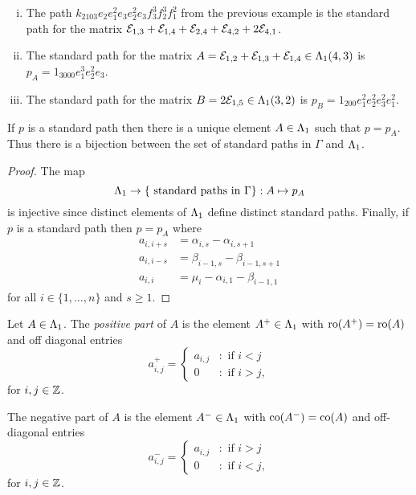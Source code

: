 \documentclass[a4paper, 11pt, twoside]{report}
\begin{document}
\begin{example}
\begin{enumerate}[(i)]
\item
The path $k_{2103}e_2e_1^2e_3e_2^2e_3f_3^3f_2^3f_1^2$ from the previous example is the standard path for the matrix $\mathcal{E}_{1,3}+\mathcal{E}_{1,4}+\mathcal{E}_{2,4}+\mathcal{E}_{4,2}+2\mathcal{E}_{4,1}$.

\item
The standard path for the matrix $A=\mathcal{E}_{1,2}+\mathcal{E}_{1,3}+\mathcal{E}_{1,4}\in\Lambda_1{}{(4,3)}$ is $p_A = 1_{3000}e_1^3e_2^2e_3$.

\item
The standard path for the matrix $B=2\mathcal{E}_{1,5}\in\Lambda_1{}{(3,2)}$ is $p_B = 1_{200}e_1^2e_2^2e_3^2e_1^2$.
\end{enumerate}
\end{example}

\begin{lemma}\label{lemma:correspondence-std-paths-to-basis}
If $p$ is a standard path then there is a unique element $A\in\Lambda_1{}$ such that $p=p_A$. Thus there is a bijection between the set of standard paths in $\Gamma$ and $\Lambda_1{}$.
\end{lemma}

\begin{proof}
The map
\begin{equation*}
\Lambda_1{}\to \{\text{ standard paths in }\Gamma\}:A\mapsto p_A
\end{equation*}
is injective since distinct elements of $\Lambda_1{}$ define distinct standard paths. Finally, if $p$ is a standard path then $p=p_A$ where
\begin{align*}
a_{i,i+s} &= \alpha_{i,s}-\alpha_{i,s+1}\\
a_{i,i-s} &= \beta_{i-1,s}-\beta_{i-1,s+1}\\
a_{i,i} &= \mu_i - \alpha_{i,1} -\beta_{i-1,1}
\end{align*}
for all $i\in\{1,\ldots,n\}$ and $s\geq 1$.
\end{proof}

\begin{definition}\label{def:matrix-pos-neg-parts}
Let $A\in\Lambda_1{}$. The \emph{positive part} of $A$ is the element $A^+\in\Lambda_1{}$ with $\operatorname{ro}(A^+)=\operatorname{ro}(A)$ and off diagonal entries
\begin{equation*}
a_{i,j}^+ = \begin{cases}
a_{i,j} &: \text{ if } i<j\\
0 &: \text{ if } i>j,
\end{cases}
\end{equation*}
for $i,j\in\mathbb{Z}$.

The negative part of $A$ is the element $A^-\in\Lambda_1{}$ with $\operatorname{co}(A^-)=\operatorname{co}(A)$ and off-diagonal entries
\begin{equation*}
a_{i,j}^- = \begin{cases}
a_{i,j} &: \text{ if } i>j\\
0 &: \text{ if } i<j,
\end{cases}
\end{equation*}
for $i,j\in\mathbb{Z}$.
\end{definition}
\end{document}
